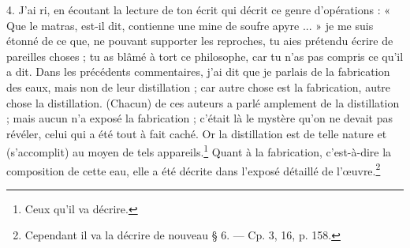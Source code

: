 \documentclass[a4paper, 11pt, oneside, polutonikogreek, french]{article}
\begin{document}
4. J'ai ri, en écoutant la lecture de ton écrit qui décrit ce genre d'opérations : « Que le matras, est-il dit, contienne une mine de soufre apyre ... » je me suis étonné de ce que, ne pouvant supporter les reproches, tu aies prétendu écrire de pareilles choses ; tu as blâmé à tort ce philosophe, car tu n'as pas compris ce qu'il a dit. Dans les précédents commentaires, j'ai dit que je parlais de la fabrication des eaux, mais non de leur distillation ; car autre chose est la fabrication, autre chose la distillation. (Chacun) de ces auteurs a parlé amplement de la distillation ; mais aucun n'a exposé la fabrication ; c'était là le mystère qu'on ne devait pas révéler, celui qui a été tout à fait caché. Or la distillation est de telle nature et (s'accomplit) au moyen de tels appareils.\footnote{Ceux qu'il va décrire.} Quant à la fabrication, c'est-à-dire la composition de cette eau, elle a été décrite dans l'exposé détaillé de l'œuvre.\footnote{Cependant il va la décrire de nouveau § 6. --- Cp. 3, 16, p. 158.}
\end{document}
